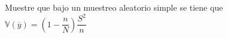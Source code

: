 
\question Muestre que bajo un muestreo aleatorio simple se tiene que $\mathbb{V}(\overline{y})=\left(1-\dfrac{n}{N}\right) \dfrac{S^2}{n}$